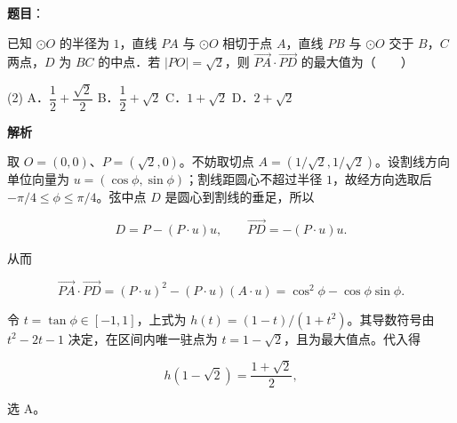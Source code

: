 \begin{answer}

\textbf{题目}：

已知 $\odot O$ 的半径为 $1$，直线 $PA$ 与 $\odot O$ 相切于点 $A$，直线 $PB$ 与 $\odot O$ 交于 $B\text{，}C$ 两点，$D$ 为 $BC$ 的中点．若 $|PO|=\sqrt2$，则 $\overrightarrow{PA}\cdot\overrightarrow{PD}$ 的最大值为\mbox{（　　）}

\begin{gkopts}(2)
\task A．$\dfrac12+\dfrac{\sqrt2}{2}$
\task B．$\dfrac12+\sqrt2$
\task C．$1+\sqrt2$
\task D．$2+\sqrt2$
\end{gkopts}

\textbf{解析}

取 $O=(0,0)$、$P=(\sqrt2,0)$。不妨取切点 $A=(1/\sqrt2,1/\sqrt2)$。设割线方向单位向量为 $u=(\cos\phi,\sin\phi)$；割线距圆心不超过半径 $1$，故经方向选取后 $-\pi/4\leqslant\phi\leqslant\pi/4$。弦中点 $D$ 是圆心到割线的垂足，所以

\nopagebreak[4]
\[
D=P-(P\cdot u)u,\qquad \overrightarrow{PD}=-(P\cdot u)u.
\]

从而

\nopagebreak[4]
\[
\overrightarrow{PA}\cdot\overrightarrow{PD}
=(P\cdot u)^2-(P\cdot u)(A\cdot u)
=\cos^2\phi-\cos\phi\sin\phi.
\]

令 $t=\tan\phi\in[-1,1]$，上式为 $h(t)=(1-t)/(1+t^2)$。其导数符号由 $t^2-2t-1$ 决定，在区间内唯一驻点为 $t=1-\sqrt2$，且为最大值点。代入得

\nopagebreak[4]
\[
h(1-\sqrt2)=\frac{1+\sqrt2}{2},
\]

选 A。


\par\medskip

\end{answer}

